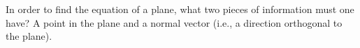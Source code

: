 {In order to find the equation of a plane, what two pieces of information must one have?
}
{A point in the plane and a normal vector (i.e., a direction orthogonal to the plane).
}

